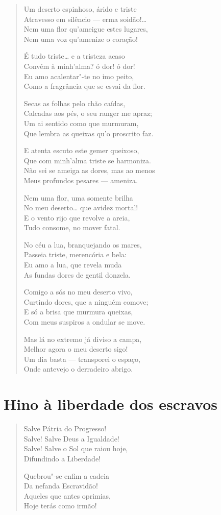 \begin{verse}
Um deserto espinhoso, árido e triste\\
Atravesso em silêncio --- erma soidão!\ldots{}\\
Nem uma flor qu'ameigue estes lugares,\\
Nem uma voz qu'amenize o coração!

É tudo triste\ldots{} e a tristeza acaso\\
Convém à minh'alma? ó dor! ó dor!\\
Eu amo acalentar"-te no imo peito,\\
Como a fragrância que se esvai da flor.

Secas as folhas pelo chão caídas,\\
Calcadas aos pés, o seu ranger me apraz;\\
Um ai sentido como que murmuram,\\
Que lembra as queixas qu'o proscrito faz.

E atenta escuto este gemer queixoso,\\
Que com minh'alma triste se harmoniza.\\
Não sei se ameiga as dores, mas ao menos\\
Meus profundos pesares --- ameniza.

Nem uma flor, uma somente brilha\\
No meu deserto\ldots{} que avidez mortal!\\
E o vento rijo que revolve a areia,\\
Tudo consome, no mover fatal.

No céu a lua, branquejando os mares,\\
Passeia triste, merencória e bela:\\
Eu amo a lua, que revela muda\\
As fundas dores de gentil donzela.

Comigo a sós no meu deserto vivo,\\
Curtindo dores, que a ninguém comove;\\
E só a brisa que murmura queixas,\\
Com meus suspiros a ondular se move.

Mas lá no extremo já diviso a campa,\\
Melhor agora o meu deserto sigo!\\
Um dia basta --- transporei o espaço,\\
Onde antevejo o derradeiro abrigo.
\end{verse}

\chapter{Hino à liberdade dos escravos}

\begin{verse}
Salve Pátria do Progresso!\\
Salve! Salve Deus a Igualdade!\\
Salve! Salve o Sol que raiou hoje,\\
Difundindo a Liberdade!

Quebrou"-se enfim a cadeia\\
Da nefanda Escravidão!\\
Aqueles que antes oprimias,\\
Hoje terás como irmão!
\end{verse}

